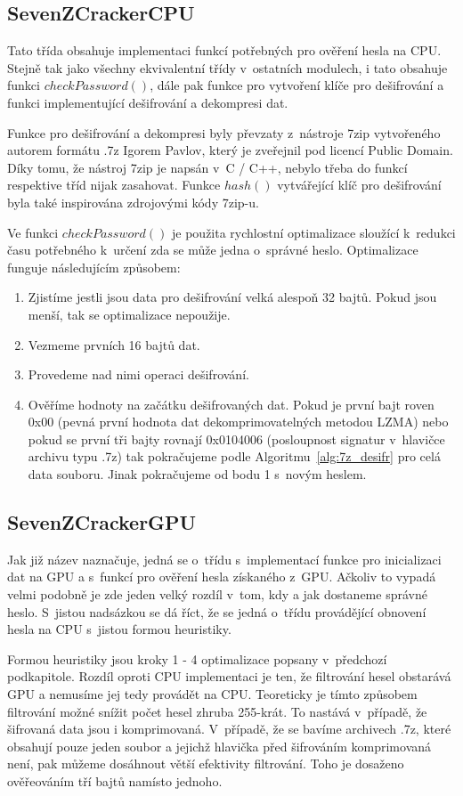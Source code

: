 \subsection{SevenZCrackerCPU}
\label{ssec:7zcrackercpu}
Tato třída obsahuje implementaci funkcí potřebných pro ověření hesla na CPU. Stejně tak jako
všechny ekvivalentní třídy v~ostatních modulech, i tato obsahuje funkci $checkPassword()$, dále pak
funkce pro vytvoření klíče pro dešifrování a funkci implementující dešifrování a dekompresi dat.

 Funkce pro dešifrování a dekompresi byly převzaty z~nástroje 7zip vytvořeného autorem formátu .7z
Igorem Pavlov, který je zveřejnil pod licencí Public Domain. Díky tomu, že nástroj 7zip je
napsán v~C / C++, nebylo třeba do funkcí respektive tříd nijak zasahovat. Funkce $hash()$
vytvářející klíč pro dešifrování byla také inspirována zdrojovými kódy 7zip-u. 

 Ve funkci $checkPassword()$ je použita rychlostní optimalizace sloužící k~redukci času
potřebného k~určení zda se může jedna o~správné heslo. Optimalizace funguje následujícím způsobem:
\begin{enumerate}
    \item Zjistíme jestli jsou data pro dešifrování velká alespoň 32 bajtů. Pokud jsou menší, tak
	se optimalizace nepoužije.
    \item Vezmeme prvních 16 bajtů dat.
    \item Provedeme nad nimi operaci dešifrování.
    \item Ověříme hodnoty na začátku dešifrovaných dat. Pokud je první bajt roven 0x00
	(pevná první hodnota dat dekomprimovatelných metodou LZMA) nebo pokud se první tři bajty rovnají
	0x0104006 (posloupnost signatur v~hlavičce archivu typu .7z) tak pokračujeme podle
	Algoritmu~\ref{alg:7z_desifr} pro celá data souboru. Jinak pokračujeme od bodu 1 s~novým heslem.
\end{enumerate}
\subsection{SevenZCrackerGPU}
Jak již název naznačuje, jedná se o~třídu s~implementací funkce pro inicializaci dat na GPU a
s~funkcí pro ověření hesla získaného z~GPU. Ačkoliv to vypadá velmi podobně je zde jeden velký
rozdíl v~tom, kdy a jak dostaneme správné heslo. S~jistou nadsázkou se dá říct, že se jedná
o~třídu provádějící obnovení hesla na CPU s~jistou formou heuristiky. 

Formou heuristiky jsou kroky 1 - 4 optimalizace popsany v~předchozí podkapitole. Rozdíl oproti
CPU implementaci je ten, že filtrování hesel obstarává GPU a nemusíme jej tedy provádět na CPU.
Teoreticky je tímto způsobem filtrování možné snížit počet hesel zhruba 255-krát. To nastává
v~případě, že šifrovaná data jsou i komprimovaná. V~případě, že se bavíme archivech .7z, které
obsahují pouze jeden soubor a jejichž hlavička před šifrováním komprimovaná není, pak můžeme
dosáhnout větší efektivity filtrování. Toho je dosaženo ověřeováním tří bajtů namísto jednoho.

